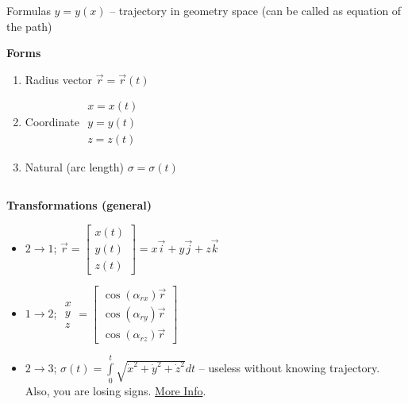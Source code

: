 \documentclass[aspectratio=169,xcolor=table,10pt, notes=hide]{beamer}
\begin{document}
\begin{frame}[t]{Formulas}
    \footnotesize
    $y = y(x)$ -- trajectory in geometry space (can be called as equation of the path)

    \centering\textbf{Forms}
    \vspace{-0.3cm}
    \begin{multicols}{3}
    \begin{enumerate}
        \footnotesize
        \item Radius vector $\vec{r} = \vec{r}(t)$
        \item Coordinate $\begin{matrix} x = x(t)\\y = y(t)\\z = z(t)\end{matrix}$
        \item Natural (arc length) $\sigma = \sigma(t)$
    \end{enumerate}
    \end{multicols}
    \vspace{-0.3cm}
    \begin{columns}[T,onlytextwidth]
        \begin{column}{0.42\textwidth}
        \textbf{Transformations (general)}
        \begin{itemize}
            \footnotesize
            \item $2 \rightarrow 1$; $\vec{r} = \begin{bmatrix}x(t)\\y(t)\\z(t)\end{bmatrix} = x\vec{i} + y\vec{j} + z\vec{k}$
            \item $1 \rightarrow 2$; $\begin{matrix} x\\ y\\ z \end{matrix} = \begin{bmatrix}
                \cos(\alpha_{rx})\vec{r}\\
                \cos(\alpha_{ry})\vec{r}\\
                \cos(\alpha_{rz})\vec{r} 
            \end{bmatrix}$
           \item $2 \rightarrow 3$; $\sigma(t)=\int \limits _{0}^{t}{\sqrt {\dot{x}^2 + \dot{y}^2 + \dot{z}^2}}dt$ -- useless without knowing trajectory. Also, you are losing signs. \href{https://youtu.be/Hfn0Oj\_METo?si=omTZDwwpof7N9uwd}{More Info}.
        \end{itemize}
        

\end{column}
\end{columns}
\end{frame}
\end{document}
